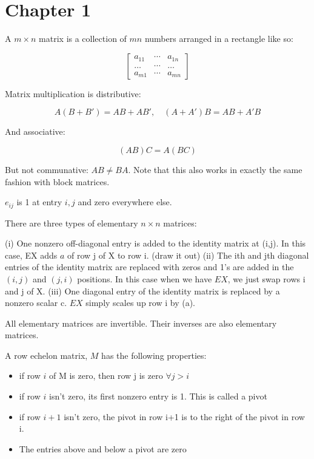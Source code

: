 \section{Chapter 1}

\begin{definition}
  A $m \times n$ matrix is a collection of $mn$ numbers arranged in a rectangle
  like so:

\[
  \begin{bmatrix}
    a_{11} & \cdots & a_{1n}\\
    \ldots  & \cdots & \ldots \\
    a_{m1} & \cdots & a_{mn}
  \end{bmatrix}
\]

Matrix multiplication is distributive:

\[A(B + B') = AB + AB',\quad (A + A')B = AB + A'B\]

And associative:

\[(AB)C=A(BC)\]

But not communative: $AB\neq BA$. Note that this also works in exactly
the same fashion with block matrices.

\end{definition}

\begin{definition}
  $e_{ij}$ is 1 at entry $i,j$ and zero everywhere else.
\end{definition}

\begin{definition}
  There are three types of elementary $n \times n$ matrices:

  (i) One nonzero off-diagonal entry is added to the identity matrix at (i,j).
  In this case, EX adds $a$ of row j of X to row i. (draw it out)
  (ii) The ith and jth diagonal entries of the identity matrix are replaced
  with zeros and 1's are added in the $(i,j)$ and $(j,i)$ positions. In this case
  when we have $EX$, we just swap rows i and j of X.
  (iii) One diagonal entry of the identity matrix is replaced by a nonzero
  scalar c. $EX$ simply scales up row i by (a).

  All elementary matrices are invertible. Their inverses are also elementary
  matrices.
\end{definition}

\begin{definition}
  A row echelon matrix, $M$ has the following properties:
  \begin{itemize}
    \item if row $i$ of M is zero, then row j is zero $\forall j > i$
    \item if row $i$ isn't zero, its first nonzero entry is 1. This is called a pivot
    \item if row $i+1$ isn't zero, the pivot in row i+1 is to the right of the pivot
      in row i.
    \item The entries above and below a pivot are zero

  \end{itemize}

\end{definition}

